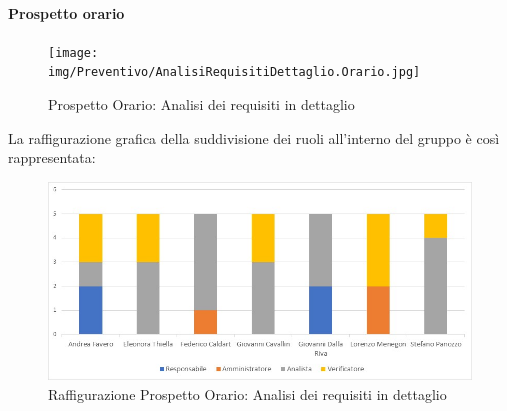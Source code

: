 \paragraph{Prospetto orario}
\begin{figure}[h!]
	\centerline{\texttt{[image: img/Preventivo/AnalisiRequisitiDettaglio.Orario.jpg]}}
	\caption{Prospetto Orario: Analisi dei requisiti in dettaglio}
\end{figure}
La raffigurazione grafica della suddivisione dei ruoli all'interno del gruppo è così rappresentata: 
\begin{figure}[h!]
	\centerline{\includegraphics[scale=0.4]{img/Preventivo/Istogrammi/AnalisiRequisitiDettaglio.jpg}}
	\caption{Raffigurazione Prospetto Orario: Analisi dei requisiti in dettaglio}
\end{figure}
